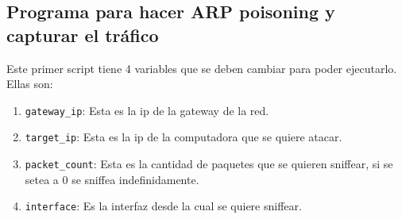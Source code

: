 \documentclass[a4paper, 13pt]{article}
\begin{document}
	\subsection{Programa para hacer ARP poisoning y capturar el tráfico}
	\par Este primer script tiene 4 variables que se deben cambiar para poder ejecutarlo. Ellas son:
	\begin{enumerate}
		\item \verb|gateway_ip|: Esta es la ip de la gateway de la red.
		\item \verb|target_ip|: Esta es la ip de la computadora que se quiere atacar.
		\item \verb|packet_count|: Esta es la cantidad de paquetes que se quieren sniffear, si se setea a 0 se sniffea indefinidamente.
		\item \verb|interface|: Es la interfaz desde la cual se quiere sniffear.
	\end{enumerate}
\end{document}
